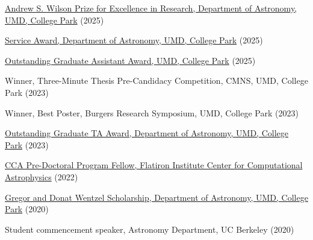 \item[{\color{numcolor}\scriptsize12}] \href{https://www.astro.umd.edu/resources/internal/awards/dept/service.html}{Andrew S. Wilson Prize for Excellence in Research, Department of Astronomy, UMD, College Park} (2025)

\item[{\color{numcolor}\scriptsize11}] \href{https://www.astro.umd.edu/resources/internal/awards/dept/service.html}{Service Award, Department of Astronomy, UMD, College Park} (2025)


\item[{\color{numcolor}\scriptsize10}] \href{https://gradschool.umd.edu/sites/default/files/2025-05/OGA_AY24-25.pdf}{Outstanding Graduate Assistant Award, UMD, College Park} (2025)


\item[{\color{numcolor}\scriptsize9}] Winner, Three-Minute Thesis Pre-Candidacy Competition, CMNS, UMD, College Park (2023)

\item[{\color{numcolor}\scriptsize8}] Winner, Best Poster, Burgers Research Symposium, UMD, College Park (2023)

\item[{\color{numcolor}\scriptsize7}] \href{https://www.astro.umd.edu/resources/internal/awards/dept/angerhofer.html}{Outstanding Graduate TA Award, Department of Astronomy, UMD, College Park} (2023)

\item[{\color{numcolor}\scriptsize6}] \href{https://www.simonsfoundation.org/flatiron-institute-center-for-computational-astrophysics-pre-doctoral-program/}{CCA Pre-Doctoral Program Fellow, Flatiron Institute Center for Computational Astrophysics} (2022)

\item[{\color{numcolor}\scriptsize5}] \href{https://www.astro.umd.edu/resources/internal/awards/dept/wentzel.html}{Gregor and Donat Wentzel Scholarship, Department of Astronomy, UMD, College Park} (2020)

\item[{\color{numcolor}\scriptsize4}] Student commencement speaker, Astronomy Department, UC Berkeley (2020)

